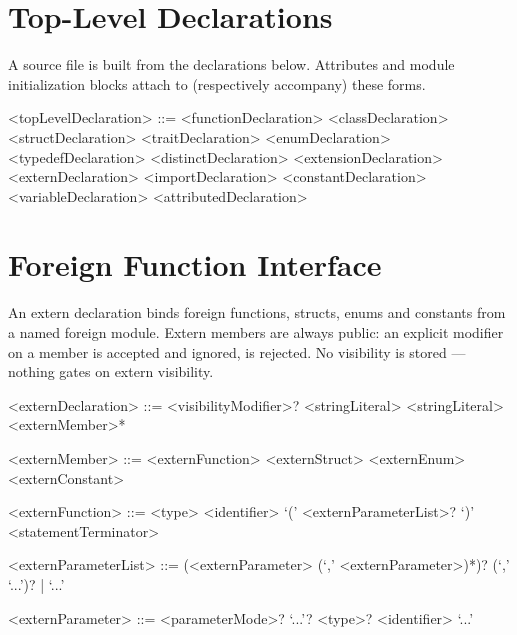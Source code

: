 \documentclass[makeidx]{article}
\begin{document}
\section{Top-Level Declarations}

\LMHash{}%
A source file is built from the declarations below.
Attributes and module initialization blocks attach to (respectively
accompany) these forms.

\begin{grammar}
<topLevelDeclaration> ::= <functionDeclaration>
  \alt <classDeclaration>
  \alt <structDeclaration>
  \alt <traitDeclaration>
  \alt <enumDeclaration>
  \alt <typedefDeclaration>
  \alt <distinctDeclaration>
  \alt <extensionDeclaration>
  \alt <externDeclaration>
  \alt <importDeclaration>
  \alt <constantDeclaration>
  \alt <variableDeclaration>
  \alt <attributedDeclaration>
\end{grammar}


\section{Foreign Function Interface}

\LMHash{}%
An extern declaration binds foreign functions, structs, enums and
constants from a named foreign module.
Extern members are always public: an explicit  modifier
on a member is accepted and ignored,  is rejected.
No visibility is stored --- nothing gates on extern visibility.

\begin{grammar}
<externDeclaration> ::= <visibilityModifier>? \EXTERN{} <stringLiteral>
  \gnewline{} \FROM{} <stringLiteral> \DO{} <externMember>* \END{}

<externMember> ::= <externFunction>
  \alt <externStruct>
  \alt <externEnum>
  \alt <externConstant>

<externFunction> ::= <type> <identifier>
  \gnewline{} `(' <externParameterList>? `)' <statementTerminator>

<externParameterList> ::= (<externParameter> (`,' <externParameter>)*)?
  \gnewline{} (`,' `...')? | `...'

<externParameter> ::= <parameterMode>? `...'? <type>? <identifier>
  \alt `...'
\end{grammar}
\end{document}
